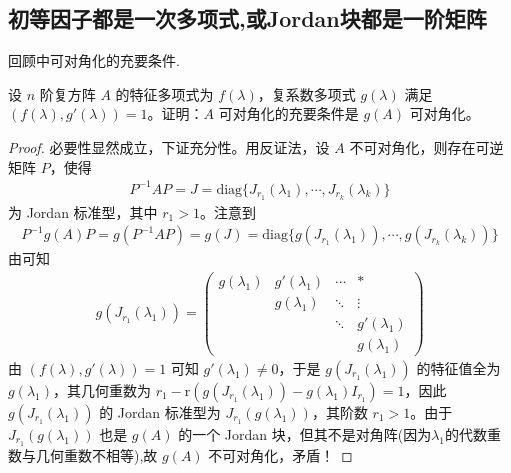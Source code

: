 \documentclass[../../main.tex]{subfiles}%
\begin{document}
\subsection{初等因子都是一次多项式,或Jordan块都是一阶矩阵}

回顾中可对角化的充要条件.

\begin{proposition}\label{proposition:矩阵可对角化关于多项式的充要条件1}
设 $n$ 阶复方阵 $A$ 的特征多项式为 $f(\lambda)$，复系数多项式 $g(\lambda)$ 满足 $(f(\lambda),g'(\lambda)) = 1$。证明：$A$ 可对角化的充要条件是 $g(A)$ 可对角化。
\end{proposition}
\begin{proof}

必要性显然成立，下证充分性。用反证法，设 $A$ 不可对角化，则存在可逆矩阵 $P$，使得
\begin{align*}
P^{-1}AP = J = \mathrm{diag}\{J_{r_1}(\lambda_1),\cdots,J_{r_k}(\lambda_k)\}
\end{align*}
为 Jordan 标准型，其中 $r_1 > 1$。注意到
\begin{align*}
P^{-1}g(A)P = g(P^{-1}AP) = g(J) = \mathrm{diag}\{g(J_{r_1}(\lambda_1)),\cdots,g(J_{r_k}(\lambda_k))\}
\end{align*}
由可知   
\begin{align*}
g(J_{r_1}(\lambda_1))=\begin{pmatrix}
g(\lambda_1) & g'(\lambda_1) & \cdots & * \\
& g(\lambda_1) & \ddots & \vdots \\
& & \ddots & g'(\lambda_1) \\
& & & g(\lambda_1)
\end{pmatrix}
\end{align*}
由 $(f(\lambda),g'(\lambda)) = 1$ 可知 $g'(\lambda_1) \neq 0$，于是 $g(J_{r_1}(\lambda_1))$ 的特征值全为 $g(\lambda_1)$，其几何重数为 $r_1 - \mathrm{r}(g(J_{r_1}(\lambda_1)) - g(\lambda_1)I_{r_1}) = 1$，因此 $g(J_{r_1}(\lambda_1))$ 的 Jordan 标准型为 $J_{r_1}(g(\lambda_1))$，其阶数 $r_1 > 1$。由于 $J_{r_1}(g(\lambda_1))$ 也是 $g(A)$ 的一个 Jordan 块，但其不是对角阵(因为$\lambda_1$的代数重数与几何重数不相等),故 $g(A)$ 不可对角化，矛盾！

\end{proof}
\end{document}
